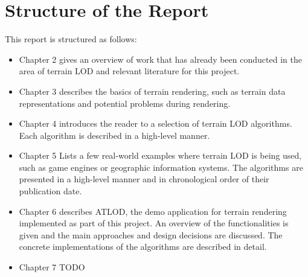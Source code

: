 \section{Structure of the Report}
This report is structured as follows:
\begin{itemize}
  \item Chapter 2 gives an overview of work that has already been conducted in the area of terrain LOD
        and relevant literature for this project.
  \item Chapter 3 describes the basics of terrain rendering, such as terrain data representations 
        and potential problems during rendering.
  \item Chapter 4 introduces the reader to a selection of terrain LOD algorithms. Each algorithm 
        is described in a high-level manner.
  \item Chapter 5 Lists a few real-world examples where terrain LOD is being used, such as 
        game engines or geographic information systems.
        The algorithms are presented in a high-level manner and in chronological order of their publication date.
  \item Chapter 6 describes ATLOD, the demo application for terrain rendering implemented as part of this project.
        An overview of the functionalities is given and the main approaches and design decisions are discussed.
        The concrete implementations of the algorithms are described in detail.
  \item Chapter 7 TODO
\end{itemize}


